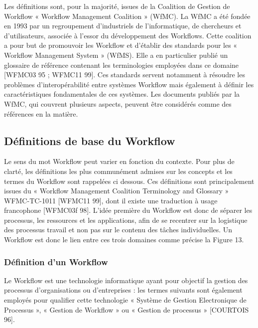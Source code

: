  	 Les définitions sont, pour la majorité, issues de la Coalition de Gestion de Workflow « Workflow Management Coalition » (WfMC). La WfMC a été fondée en 1993 par un regroupement d’industriels de l’informatique, de chercheurs et d’utilisateurs, associée à l’essor du développement des Workflows. Cette coalition a pour but de promouvoir les Workflow et d’établir des standards pour les « Workflow Management System » (WfMS). Elle a en particulier publié un glossaire de référence contenant les terminologies employées dans ce domaine [WFMC03 95 ; WFMC11 99]. Ces standards servent notamment à résoudre les problèmes d’interopérabilité entre systèmes Workflow mais également à définir les caractéristiques fondamentales de ces systèmes. Les documents publiés par la WfMC, qui couvrent plusieurs aspects, peuvent être considérés comme des références en la matière. 
 	
 	\subsection{Définitions de base du Workflow } 
 	 
 	 Le sens du mot Workflow peut varier en fonction du contexte. Pour plus de clarté, les définitions les plus communément admises sur les concepts et les termes du Workflow sont rappelées ci dessous. Ces définitions sont principalement issues du « Workflow Management Coalition Terminology and Glossary » WFMC-TC-1011 [WFMC11 99], dont il existe une traduction à usage francophone [WFMC03f 98]. L’idée première du Workflow est donc de séparer les processus, les ressources et les applications, afin de se recentrer sur la logistique des processus travail et non pas sur le contenu des tâches individuelles. Un Workflow est donc le lien entre ces trois domaines comme précise la Figure 13. 
 	 
 	 
 	 
 	 
 	 
 	 
 	 
 	 
 	 
 	 
 	 
 	 \subsubsection{Définition d’un Workflow }
 	 
 	 
 	 Le Workflow est une technologie informatique ayant pour objectif la gestion des processus d’organisations ou d’entreprises : les termes suivants sont également employés pour qualifier cette technologie « Système de Gestion Electronique de Processus », « Gestion de Workflow » ou « Gestion de processus » [COURTOIS 96]. 
 	 
